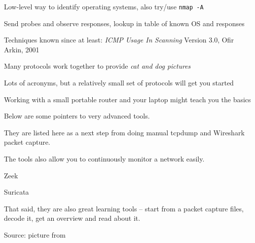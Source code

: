 \documentclass[Screen16to9,17pt]{foils}
\begin{document}
\begin{list2}
\item Low-level way to identify operating systems, also try/use
  \verb+nmap -A+
\item Send probes and observe responses, lookup in table of known OS and responses
\item Techniques known since at least: \emph{ICMP Usage In Scanning} Version 3.0,
  Ofir Arkin, 2001 %
\end{list2}







\begin{list2}
\item Many protocols work together to provide \emph{cat and dog pictures}
\item Lots of acronyms, but a relatively small set of protocols will get you started
\item Working with a small portable router and your laptop might teach you the basics
\end{list2}

\myquestionspage




Below are some pointers to very advanced tools.

They are listed here as a next step from doing manual tcpdump and Wireshark packet capture.

The tools also allow you to continuously monitor a network easily.

\begin{list2}
\item Zeek
\item Suricata
\end{list2}

That said, they are also great learning tools -- start from a packet capture files, decode it, get an overview and read about it.


Source: picture from 
\end{document}
